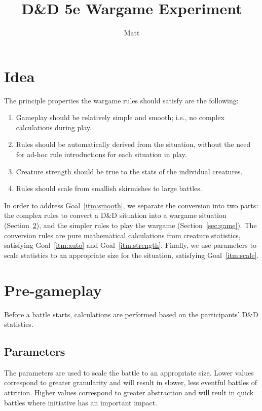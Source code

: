 \documentclass{article}
\begin{document}
\title{D\&D 5e Wargame Experiment}
\author{Matt}
\maketitle

\section{Idea}

The principle properties the wargame rules should satisfy are the following:
\begin{enumerate}
    \item \label{itm:smooth} Gameplay should be relatively simple and smooth;
        i.e., no complex calculations during play.
    \item \label{itm:auto} Rules should be automatically derived from the situation,
        without the need for ad-hoc rule introductions for each situation in play.
    \item \label{itm:strength} Creature strength should be true to the stats of the individual creatures.
    \item \label{itm:scale} Rules should scale from smallish skirmishes to large battles.
\end{enumerate}

In order to address Goal~\ref{itm:smooth}, we separate the conversion into two parts:
the complex rules to convert a D\&D situation into a wargame situation (Section~\ref{sec:pregame}),
and the simpler rules to play the wargame (Section~\ref{sec:game}).
The conversion rules are pure mathematical calculations from creature statistics,
satisfying Goal~\ref{itm:auto} and Goal~\ref{itm:strength}.
Finally, we use parameters to scale statistics to an appropriate size for the situation,
satisfying Goal~\ref{itm:scale}.

\section{Pre-gameplay}\label{sec:pregame}

Before a battle starts,
calculations are performed based on the participants' D\&D statistics.

\subsection{Parameters}

The parameters are used to scale the battle to an appropriate size.
Lower values correspond to greater granularity
and will result in slower, less eventful battles of attrition.
Higher values correspond to greater abstraction
and will reult in quick battles where initiative has an important impact.
\end{document}
